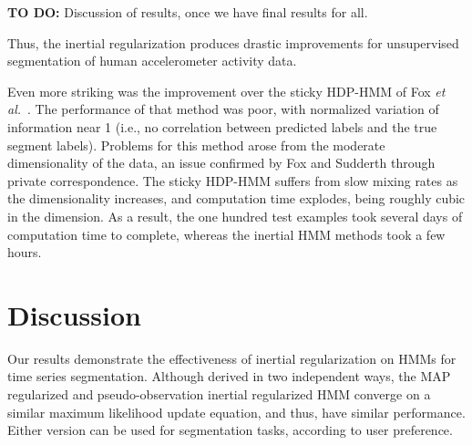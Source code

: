 \documentclass[12pt]{article}
\begin{document}
\textbf{TO DO:} Discussion of results, once we have final results for all.
%
%

Thus, the inertial regularization produces drastic improvements for unsupervised segmentation of human accelerometer activity data.

Even more striking was the improvement over the sticky HDP-HMM of Fox \emph{et al.}~\cite{fox2011sticky}. The performance of that method was poor, with normalized variation of information near 1 (i.e., no correlation between predicted labels and the true segment labels). Problems for this method arose from the moderate dimensionality of the data, an issue confirmed by Fox and Sudderth through private correspondence. The sticky HDP-HMM suffers from slow mixing rates as the dimensionality increases, and computation time explodes, being roughly cubic in the dimension. As a result, the one hundred test examples took several days of computation time to complete, whereas the inertial HMM methods took a few hours.

\section{Discussion}

Our results demonstrate the effectiveness of inertial regularization on HMMs for time series segmentation. Although derived in two independent ways, the MAP regularized and pseudo-observation inertial regularized HMM converge on a similar maximum likelihood update equation, and thus, have similar performance. Either version can be used for segmentation tasks, according to user preference. 
\end{document}
